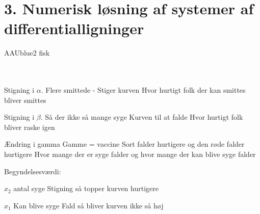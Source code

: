 \section*{3. Numerisk løsning af systemer af differentialligninger}
% 
%
\begin{color}{AAUblue2}
%
fisk
% 
\end{color}
\\\\
% 
Stigning i $\alpha$. 
Flere smittede - Stiger kurven 
Hvor hurtigt folk der kan smittes bliver smittes 

Stigning i $\beta$. 
Så der ikke så mange syge 
Kurven til at falde 
Hvor hurtigt folk bliver raske igen

Ændring i gamma 
Gamme = vaccine 
Sort falder hurtigere 
og den røde falder hurtigere
Hvor mange der er syge falder og hvor mange der kan blive syge falder 


Begyndelsesværdi: 

$x_2$ antal syge 
Stigning så topper kurven hurtigere
 
$x_1$ Kan blive syge 
Fald så bliver kurven ikke så høj 

%
